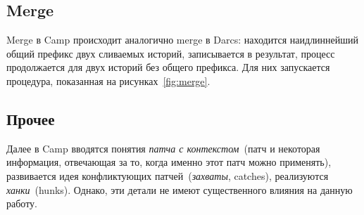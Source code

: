 \subsection{Merge}

Merge в Camp происходит аналогично merge в Darcs: находится
наидлиннейший общий префикс двух сливаемых историй, записывается в
результат, процесс продолжается для двух историй без общего префикса.
Для них запускается процедура, показанная на рисунках~\ref{fig:merge}.

\subsection{Прочее}

Далее в Camp вводятся понятия \emph{патча с контекстом}~(патч и
некоторая информация, отвечающая за то, когда именно этот патч можно
применять), развивается идея конфликтующих патчей~(\emph{захваты},
catches), реализуются \emph{ханки}~(hunks). Однако, эти детали не
имеют существенного влияния на данную работу.

